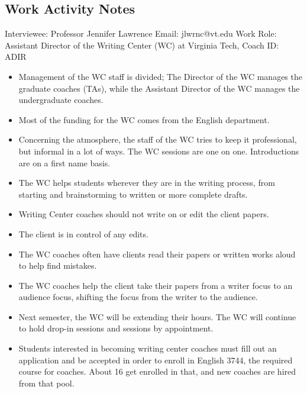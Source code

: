 \documentclass[12pt]{article} %
\begin{document}
  \subsection*{Work Activity Notes}

  Interviewee: Professor Jennifer Lawrence 
  Email: jlwrnc@vt.edu
  Work Role: Assistant Director of the Writing Center (WC) at Virginia Tech, Coach
  ID: ADIR

  \begin{itemize} \itemsep1pt \parskip0pt 
    \item Management of the WC staff is divided; The Director of the WC manages the graduate coaches (TAs), while the Assistant Director of the WC manages the undergraduate coaches.
     
    \item Most of the funding for the WC comes from the English department.
     
    \item Concerning the atmosphere, the staff of the WC tries to keep it professional, but informal in a lot of ways.  The WC sessions are one on one.  Introductions are on a first name basis. 
     
    \item The WC helps students wherever they are in the writing process, from starting and brainstorming to written or more complete drafts.
     
    \item Writing Center coaches should not write on or edit the client papers.
     
    \item The client is in control of any edits.
     
    \item The WC coaches often have clients read their papers or written works aloud to help find mistakes.
     
    \item The WC coaches help the client take their papers from a writer focus to an audience focus, shifting the focus from the writer to the audience.
     
    \item Next semester, the WC will be extending their hours.  The WC will continue to hold drop-in sessions and sessions by appointment.
     
    \item Students interested in becoming writing center coaches must fill out an application and be accepted in order to enroll in English 3744, the required course for coaches.  About 16 get enrolled in that, and new coaches are hired from that pool.
     

\end{itemize}
\end{document}
